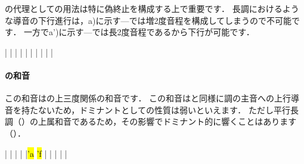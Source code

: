\documentclass[dvipdfmx,uplatex,b5paper,openany,jbase=12Q,nomag*,textwidth-limit=44%
               ]{gachimuchi}
\begin{document}
の代理としての用法は特に偽終止を構成する上で重要です．
長調におけるような導音の下行進行は，a)に示す---では増2度音程を構成してしまうので不可能です．
一方でa')に示す---では長2度音程であるから下行が可能です．

\begin{floatMusic}[pos=ht]
  \Startpiece%
  \znotes|\en
  \NOTes
  |%
  \en\bar
  \NOTEs
  |%
  \en\doublebar
  \NOTEs
  |%
  \en\bar
  \NOTEs
  |%
  \en\doublebar
  \NOTes
  |%
  \en\bar
  \NOTes
  \Mryaku\sk%
  |%
  \Mryaku\sk
  \en\setdoublebar
  \endpiece%
\end{floatMusic}


\paragraph{\bFlat\Gnvii の和音}
この和音は\Gnv\Min の上三度関係の和音です．
この和音は\Gnv\Min と同様に調の主音への上行導音を持たないため，ドミナントとしての性質は弱いといえます．
ただし平行長調（）の上属和音であるため，その影響でドミナント的に響くことはあります
（）．

\begin{floatMusic}[pos=ht]
  \Startpiece%
  \znotes|\en
  \NOTes
  |%
  \en\bar
  \NOTEs
  |%
  \en\doublebar
  \NOTes
  |\hl{'a}%
  \hl{'f}%
  \en\bar
  \NOTEs
  |%
  \en\doublebar
  \NOTes
  |%
  \en\bar
  \NOTEs
  |%
  \en\setdoublebar
  \endpiece%
\end{floatMusic}
\end{document}
